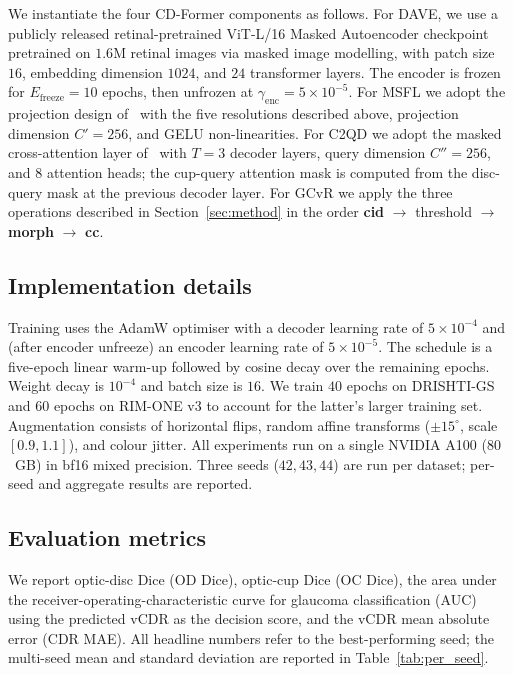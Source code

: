 \documentclass[10pt,journal,twocolumn]{IEEEtran}
\begin{document}
We instantiate the four CD-Former components as follows. For DAVE, we use a publicly released retinal-pretrained ViT-L/16 Masked Autoencoder checkpoint~\cite{retfound2023nature} pretrained on $1.6$M retinal images via masked image modelling, with patch size $16$, embedding dimension $1024$, and $24$ transformer layers. The encoder is frozen for $E_\text{freeze}=10$ epochs, then unfrozen at $\gamma_\text{enc} = 5\!\times\!10^{-5}$. For MSFL we adopt the projection design of~\cite{dinounet2025} with the five resolutions described above, projection dimension $C'=256$, and GELU non-linearities. For C2QD we adopt the masked cross-attention layer of~\cite{cheng2022mask2former} with $T=3$ decoder layers, query dimension $C''=256$, and $8$ attention heads; the cup-query attention mask is computed from the disc-query mask at the previous decoder layer. For GCvR we apply the three operations described in Section~\ref{sec:method} in the order \textbf{cid} $\to$ threshold $\to$ \textbf{morph} $\to$ \textbf{cc}.

\subsection{Implementation details}

Training uses the AdamW optimiser with a decoder learning rate of $5\!\times\!10^{-4}$ and (after encoder unfreeze) an encoder learning rate of $5\!\times\!10^{-5}$. The schedule is a five-epoch linear warm-up followed by cosine decay over the remaining epochs. Weight decay is $10^{-4}$ and batch size is $16$. We train $40$ epochs on DRISHTI-GS and $60$ epochs on RIM-ONE v3 to account for the latter's larger training set. Augmentation consists of horizontal flips, random affine transforms ($\pm 15^\circ$, scale $[0.9, 1.1]$), and colour jitter. All experiments run on a single NVIDIA A100 ($80$~GB) in bf16 mixed precision. Three seeds ($42, 43, 44$) are run per dataset; per-seed and aggregate results are reported.

\subsection{Evaluation metrics}

We report optic-disc Dice (OD Dice), optic-cup Dice (OC Dice), the area under the receiver-operating-characteristic curve for glaucoma classification (AUC) using the predicted vCDR as the decision score, and the vCDR mean absolute error (CDR MAE). All headline numbers refer to the best-performing seed; the multi-seed mean and standard deviation are reported in Table~\ref{tab:per_seed}.
\end{document}
